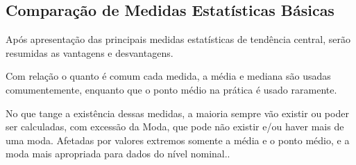 


\subsection{Comparação de Medidas Estatísticas Básicas}

\inic Após apresentação das principais medidas estatísticas de tendência central, serão resumidas as vantagens e desvantagens.\vskip0.3cm

\inic Com relação o quanto é comum cada medida, a média e mediana são usadas comumentemente, enquanto que o ponto médio na prática é usado raramente.\vskip0.3cm


\inic No que tange a existência dessas medidas, a maioria sempre vão existir ou poder ser calculadas, com excessão da Moda, que pode não existir e/ou haver mais de uma moda. Afetadas por valores extremos somente a média e o ponto médio, e a moda mais apropriada para dados do nível nominal..


